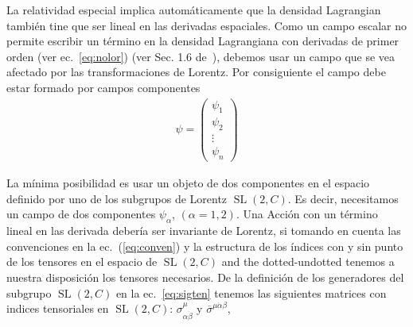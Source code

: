La relatividad especial implica automáticamente que la densidad Lagrangian también tine que ser lineal en las derivadas espaciales.
Como un campo escalar no permite escribir un término en la densidad Lagrangiana con derivadas de primer orden (ver ec.~\eqref{eq:nolor}) (ver Sec. 1.6 de~\cite{Greiner:1990tz}), debemos usar
un campo que se vea afectado por las transformaciones de Lorentz. Por consiguiente el campo debe estar formado por campos componentes
\begin{align}
  \psi=  \begin{pmatrix}
\psi_1\\
\psi_2\\
\vdots\\
\psi_n    
  \end{pmatrix}
\end{align}

%


  La mínima posibilidad es usar un objeto de dos componentes en el espacio definido por uno de los subgrupos
  de Lorentz $\operatorname{SL}(2,C)$. Es decir, necesitamos un campo
  de dos componentes $\psi_{\alpha}$, $(\alpha=1,2)$.
  Una Acción con un término lineal en las derivada debería ser invariante de Lorentz, si tomando en
  cuenta las convenciones en la ec.~(\ref{eq:conven}) y la estructura de los índices con y sin punto
  de los tensores en el espacio de  $\operatorname{SL}(2,C)$ and the dotted-undotted tenemos a
  nuestra disposición los tensores necesarios.
  De la definición de los generadores del subgrupo $\operatorname{SL}(2,C)$ en la ec.~\eqref{eq:sigten} tenemos las siguientes
  matrices con indices tensoriales en $\operatorname{SL}(2,C)$:
   $\sigma^{\mu}_{\alpha\dot{\beta}}$ y $\overline{\sigma}^{\mu\dot{\alpha}\beta}$,

